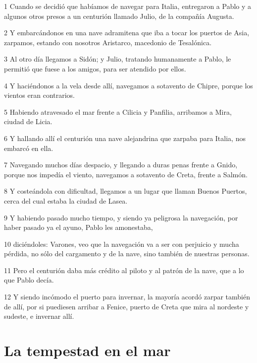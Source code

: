 \par 1 Cuando se decidió que habíamos de navegar para Italia, entregaron a Pablo y a algunos otros presos a un centurión llamado Julio, de la compañía Augusta.
\par 2 Y embarcándonos en una nave adramitena que iba a tocar los puertos de Asia, zarpamos, estando con nosotros Aristarco, macedonio de Tesalónica.
\par 3 Al otro día llegamos a Sidón; y Julio, tratando humanamente a Pablo, le permitió que fuese a los amigos, para ser atendido por ellos.
\par 4 Y haciéndonos a la vela desde allí, navegamos a sotavento de Chipre, porque los vientos eran contrarios.
\par 5 Habiendo atravesado el mar frente a Cilicia y Panfilia, arribamos a Mira, ciudad de Licia.
\par 6 Y hallando allí el centurión una nave alejandrina que zarpaba para Italia, nos embarcó en ella.
\par 7 Navegando muchos días despacio, y llegando a duras penas frente a Gnido, porque nos impedía el viento, navegamos a sotavento de Creta, frente a Salmón.
\par 8 Y costeándola con dificultad, llegamos a un lugar que llaman Buenos Puertos, cerca del cual estaba la ciudad de Lasea.
\par 9 Y habiendo pasado mucho tiempo, y siendo ya peligrosa la navegación, por haber pasado ya el ayuno, Pablo les amonestaba,
\par 10 diciéndoles: Varones, veo que la navegación va a ser con perjuicio y mucha pérdida, no sólo del cargamento y de la nave, sino también de nuestras personas.
\par 11 Pero el centurión daba más crédito al piloto y al patrón de la nave, que a lo que Pablo decía.
\par 12 Y siendo incómodo el puerto para invernar, la mayoría acordó zarpar también de allí, por si puediesen arribar a Fenice, puerto de Creta que mira al nordeste y sudeste, e invernar allí.

\section*{La tempestad en el mar}

